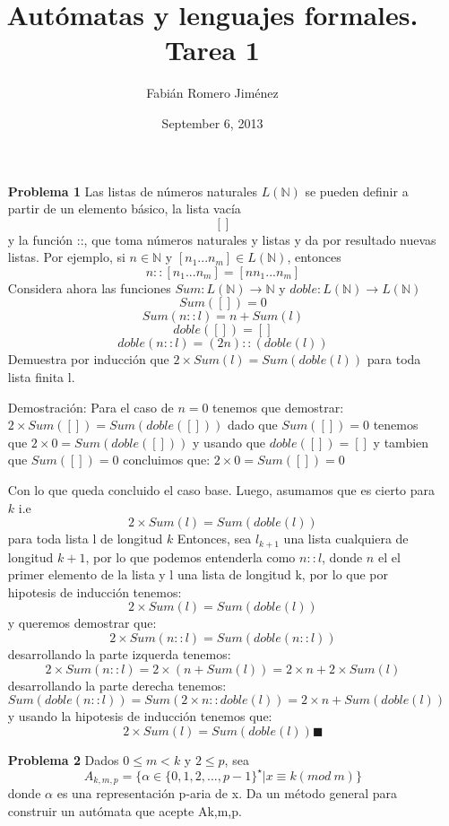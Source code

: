 \documentclass{article}
\title{Autómatas y lenguajes formales. Tarea 1}
\author{Fabián Romero Jiménez}
\date{September 6, 2013}
\begin{document}
\maketitle
\begin{enumerate}
\item[\bf{Problema 1}] Las listas de números naturales $L( \mathbb{N} )$ se pueden definir a partir de un elemento básico, la lista vacía
$$ [ ] $$
y la función ::, que toma números naturales y listas y da por resultado nuevas listas. Por ejemplo, si $ n \in \mathbb{N}$ y $[n_{1} . . . n_{m}] \in L(\mathbb{N}) $, entonces $$ n :: [n_{1} . . . n_{m}] = [n n_{1} . . . n_{m}] $$
Considera ahora las funciones $ Sum : L(\mathbb{N}) \rightarrow \mathbb{N} $ y $ doble : L(\mathbb{N}) \rightarrow L(\mathbb{N}) $
$$ Sum([ ]) = 0     $$
$$ Sum(n :: l) = n + Sum(l)   $$
$$ doble([ ]) = [ ] $$
$$ doble(n :: l) = (2  n) :: (doble(l)) $$
Demuestra por inducción que $ 2 \times Sum(l) = Sum(doble(l))$ para toda lista finita l.

\item[Demostración:]
Para el caso de $n = 0$ tenemos que demostrar:
$  2 \times Sum([]) = Sum(doble([]))  $
dado que $ Sum([ ]) = 0  $ tenemos que $  2 \times 0 = Sum(doble([]))  $
y usando que $ doble([ ]) = [ ] $ y tambien que $ Sum([ ]) = 0  $
concluimos que: $  2 \times 0 = Sum([])= 0 $

Con lo que queda concluido el caso base.
Luego, asumamos que es cierto para  $k$
i.e
$$  2 \times Sum(l) = Sum(doble(l)) $$ para toda lista l de longitud $k$
Entonces, sea $l_{k+1}$ una lista cualquiera de longitud $k+1$, por lo que podemos entenderla como $n::l$, donde $n$ el el primer elemento de la lista y l una lista de longitud k, por lo que por hipotesis de inducción tenemos:
$$  2 \times Sum(l) = Sum(doble(l))  $$
y queremos demostrar que:
$$  2 \times Sum(n::l) = Sum(doble(n::l))  $$
desarrollando la parte izquerda tenemos:
$$ 2 \times Sum(n::l) = 2 \times (n + Sum(l))=2 \times n + 2 \times Sum(l) $$
desarrollando la parte derecha tenemos:
$$ Sum(doble(n::l)) = Sum(2 \times n :: doble(l)) = 2 \times n + Sum (doble(l)) $$
y usando la hipotesis de inducción tenemos que:
$$ 2 \times Sum(l) = Sum(doble(l))   \blacksquare$$

\item[\bf{Problema 2}] Dados $0 \le m < k$ y $2 \le p$, sea
$$A_{k,m,p} = \{\alpha \in \{0,1,2,...,p-1\}^\star | x \equiv k (mod\ m) \}$$ donde $\alpha$ es una representación p-aria de x.
Da un método general para construir un autómata que acepte Ak,m,p.


\end{enumerate}
\end{document}
